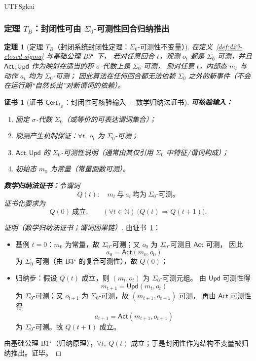 \documentclass[12pt]{article}
\newtheorem{theorem}{定理}[section]
\newtheorem{Certificate}{证书}[section]
\newcommand{\NN}{\ensuremath{\mathbb{N}}}
\begin{document}
\begin{CJK*}{UTF8}{gkai}
\subsubsection{定理 $T_B$：封闭性可由 $\Sigma_0$-可测性回合归纳推出}
\label{subsec:tex24-tb}

\begin{theorem}[定理 $T_B$（封闭系统封闭性定理：$\Sigma_0$-可测性不变量）]
\label{thm:tex24-tb}
在定义~\ref{def:d23-closed-sigma} 与基础公理 B3$^\star$ 下，
若对任意回合 $t$，观测 $o_t$ 都是 $\Sigma_0$-可测，并且 $\mathsf{Act},\mathsf{Upd}$ 作为映射在适当的积 $\sigma$-代数上是 $\Sigma_0$-可测，
则对任意 $t$，内部态 $m_t$ 与动作 $a_t$ 均为 $\Sigma_0$-可测；
因此算法在任何回合都无法依赖 $\Sigma_0$ 之外的新事件（不会在运行期“自然长出”对新谓词的依赖）。
\end{theorem}

\begin{Certificate}[证书 $\mathsf{Cert}_{T_B}$：封闭性可核验输入 + 数学归纳法证书]
\label{cert:tex24-tb}
\textbf{可核验输入：}
\begin{enumerate}
  \item 固定 $\sigma$-代数 $\Sigma_0$（或等价的可表达谓词集合）；
  \item 观测产生机制保证：$\forall t,\ o_t$ 为 $\Sigma_0$-可测；
  \item $\mathsf{Act},\mathsf{Upd}$ 的 $\Sigma_0$-可测性说明（通常由其仅引用 $\Sigma_0$ 中特征/谓词构成）；
  \item 初始态 $m_0$ 为常量（常量函数可测）。
\end{enumerate}

\textbf{数学归纳法证书：}令谓词
\[
  Q(t):\quad m_t\ \text{与}\ a_t\ \text{均为}\ \Sigma_0\text{-可测。}
\]
证书化要求为
\[
  Q(0)\ \text{成立},\qquad
  (\forall t\in\NN)\ \bigl(Q(t)\Rightarrow Q(t+1)\bigr).
\]
\end{Certificate}

\begin{proof}[证明（数学归纳法证书；谓词因果链）]
由证书~\ref{cert:tex24-tb}：
\begin{itemize}
  \item 基例 $t=0$：$m_0$ 为常量，故 $\Sigma_0$-可测；又 $o_0$ 为 $\Sigma_0$-可测且 $\mathsf{Act}$ 可测，
  因此
  \[
    a_0=\mathsf{Act}(m_0,o_0)
  \]
  为 $\Sigma_0$-可测（由 B3$^\star$ 的复合可测性），故 $Q(0)$；
  \item 归纳步：假设 $Q(t)$ 成立，则 $(m_t,o_t)$ 为 $\Sigma_0$-可测元组。
  由 $\mathsf{Upd}$ 可测性得
  \[
    m_{t+1}=\mathsf{Upd}(m_t,o_t)
  \]
  为 $\Sigma_0$-可测；又 $o_{t+1}$ 为 $\Sigma_0$-可测，故 $(m_{t+1},o_{t+1})$ 可测，
  再由 $\mathsf{Act}$ 可测性得
  \[
    a_{t+1}=\mathsf{Act}(m_{t+1},o_{t+1})
  \]
  为 $\Sigma_0$-可测。故 $Q(t+1)$ 成立。
\end{itemize}
由基础公理 B1$^\star$（归纳原理），$\forall t,\ Q(t)$ 成立；于是封闭性作为结构不变量被归纳推出。证毕。
\end{proof}


\end{CJK*}
\end{document}
